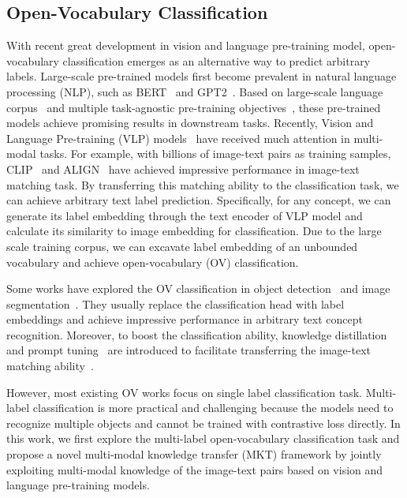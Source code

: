 \documentclass[letterpaper]{article} %
\begin{document}
\subsection{Open-Vocabulary Classification}
With recent great development in vision and language pre-training model, open-vocabulary  classification emerges as an alternative way to predict arbitrary labels.
Large-scale pre-trained models first become prevalent in natural language processing (NLP), such as BERT~\cite{devlin2018bert} and GPT2~\cite{radford2019language}.
Based on large-scale language corpus~\cite{raffel2020exploring} and multiple task-agnostic pre-training objectives~\cite{devlin2018bert}, these pre-trained models achieve promising results in downstream tasks.
Recently, Vision and Language Pre-training (VLP) models~\cite{ViLBERT, chen2020uniter, li2020unicoder, li2020oscar, kim2021vilt} have received much attention in multi-modal tasks.
For example, with billions of image-text pairs as training samples, CLIP~\cite{clip} and ALIGN~\cite{align} have achieved impressive performance in image-text matching task.
By transferring this matching ability to the classification task, we can achieve arbitrary text label prediction.
Specifically, for any concept, we can generate its label embedding through the text encoder of VLP model and calculate its similarity to image embedding for classification.
Due to the large scale training corpus, we can excavate label embedding of an unbounded vocabulary and achieve open-vocabulary (OV) classification. \par
Some works have explored the OV classification in object detection~\cite{ovrcnn, openvild, openprompt, openonstage, opendetr} and image segmentation~\cite{opensedo, openseg}.
They usually replace the classification head with label embeddings and achieve impressive performance in arbitrary text concept recognition.
Moreover, to boost the classification ability, knowledge distillation~\cite{hinton2015distilling} and prompt tuning~\cite{li2021prefix} are introduced to facilitate transferring the image-text matching ability~\cite{coop}. \par
However, most existing OV works focus on single label classification task.
Multi-label classification is more practical and challenging because the models need to recognize multiple objects and cannot be trained with contrastive loss directly.
In this work, we first explore the multi-label open-vocabulary classification task and propose a novel multi-modal knowledge transfer (MKT) framework by jointly exploiting multi-modal knowledge of the image-text pairs based on vision and language pre-training models.
\end{document}
